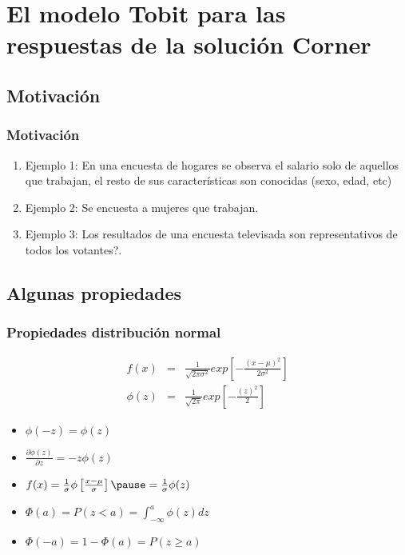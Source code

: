 \section[Tobit]{El modelo Tobit para las respuestas de la solución Corner}
\subsection{Motivación}
\begin{frame}[fragile]
	\frametitle{Motivación}
	
	\begin{enumerate}
		\item Ejemplo 1: En una encuesta de hogares se observa el salario solo de aquellos que trabajan, el resto de sus características son conocidas (sexo, edad, etc) 
		
		\item Ejemplo 2: Se encuesta a mujeres que trabajan.
		
		\item Ejemplo 3: Los resultados de una encuesta televisada son representativos de todos los votantes?.
		
	\end{enumerate}
	
	
\end{frame}

\subsection{Algunas propiedades}

\begin{frame}[fragile]
	\frametitle{Propiedades distribución normal}
	
	\begin{eqnarray*}
		f(x) &=& \frac{1}{\sqrt{2\pi\sigma^2}} exp \left[ -\frac{(x-\mu)^2}{2\sigma^2}
		\right] \\
		\phi(z) &=& \frac{1}{\sqrt{2\pi}} exp \left[ -\frac{(z)^2}{2} \right]
	\end{eqnarray*}
	
	\begin{itemize}
		\item $\phi(-z)=\phi(z)$
		\pause
		\item $\frac{\partial \phi(z)}{\partial z}=-z \phi(z)$
		\pause
		\item $f(x)=\frac{1}{\sigma} \phi \left[ \frac{x-\mu}{\sigma} \right]
		\pause
		= \frac{1}{\sigma} \phi (z)$
		\pause
		\item $\Phi(a)=P(z<a)=\int_{-\infty}^{a}\phi(z)dz$
		\pause
		\item $\Phi(-a)=1-\Phi(a)=P(z\geq a)$
	\end{itemize}
	
\end{frame}

